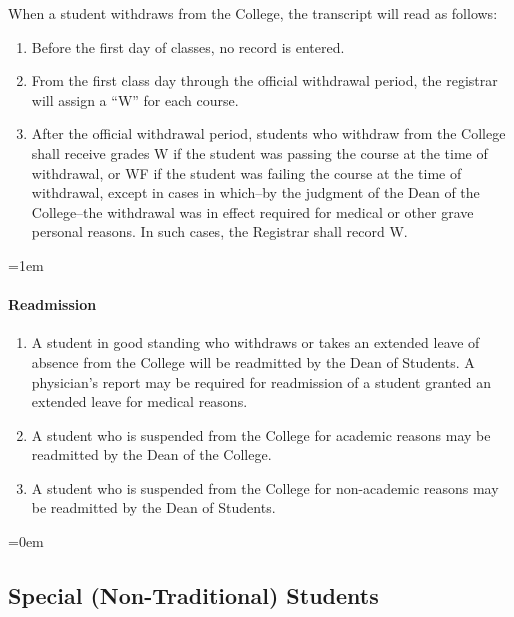 \documentclass{manual}
\newcommand{\modified}[1]{}
\newcommand{\oldbreak}[1]{}
\let\oldsubsection\subsection
\renewcommand\subsection{\leftskip=0em\oldsubsection}
\let\oldparagraph\paragraph
\renewcommand\paragraph{\leftskip=1em\oldparagraph}
\begin{document}
When a student withdraws from the College, the transcript will read as follows:

\begin{enumerate}[label=\alph*)]

\item Before the first day of classes, no record is entered.

\item From the first class day through the official withdrawal period, the registrar will assign a ``W'' for each course.

\oldbreak{IX-2}

\item After the official withdrawal period, students who withdraw from the College shall \modified{2/12/02 } receive grades W if the student was passing the course at the time of withdrawal, or WF if the student was failing the course at the time of withdrawal, except in cases in which--by the judgment of the Dean of the College--the withdrawal was in effect required for medical or other grave personal reasons. In such cases, the Registrar shall record W.

\end{enumerate}

\paragraph{Readmission}
\begin{enumerate}[label=\alph*)]
\item A student in good standing who withdraws or takes an extended leave of absence from the College will be readmitted by the Dean of Students. A physician's report may be required for readmission of a student granted an extended leave for medical reasons.

\item A student who is suspended from the College for academic reasons may be readmitted by the Dean of the College.

\item A student who is suspended from the College for non-academic reasons may be readmitted by the Dean of Students.
\end{enumerate}

\oldbreak{IX-3}

\subsection{Special (Non-Traditional) Students}\label{sec:NonTraditionalStudents}
\end{document}
